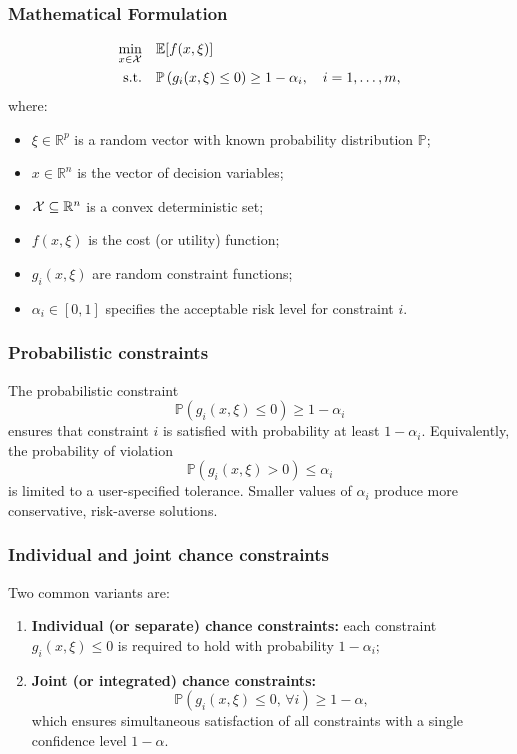 \documentclass{beamer}
\begin{document}
\begin{frame}
\frametitle{Mathematical Formulation}

$$
\begin{aligned}
	\min_{x \in {\mathcal{X}}} \quad & \mathbb{E}[f(x, \xi)] \\
	\text{s.t.} \quad & \mathbb{P}\left( g_i(x, \xi) \leq 0 \right) \geq 1 - \alpha_i, \quad i = 1, \ldots, m,
\end{aligned}
$$
where:
\begin{itemize}
\item \( \xi \in \mathbb{R}^p \) is a random vector with known probability distribution \( \mathbb{P} \);
	\item \( x \in \mathbb{R}^n \) is the vector of decision variables;
	\item \( {\mathcal{X}} \subseteq \mathbb{R}^n \) is a convex deterministic set;
	\item \( f(x, \xi) \) is the cost (or utility) function;
	\item \( g_i(x, \xi) \) are random constraint functions;
	\item \( \alpha_i \in [0, 1] \) specifies the acceptable risk level for constraint \( i \).
\end{itemize}

\end{frame}

\begin{frame}
\frametitle{Probabilistic constraints}

The probabilistic constraint 
\[
\mathbb{P}\left( g_i(x, \xi) \leq 0 \right) \geq 1 - \alpha_i
\]
ensures that constraint \( i \) is satisfied with probability at least \( 1 - \alpha_i \). Equivalently, the probability of violation 
\[
\mathbb{P}\left( g_i(x, \xi) > 0 \right) \leq \alpha_i
\]
is limited to a user-specified tolerance. Smaller values of \( \alpha_i \) produce more conservative, risk-averse solutions.

\end{frame}

\begin{frame}
\frametitle{Individual and joint chance constraints}

Two common variants are:
\begin{enumerate}
	\item \textbf{Individual (or separate) chance constraints:} each constraint \( g_i(x, \xi) \leq 0 \) is required to hold with probability \( 1 - \alpha_i \);
	\item \textbf{Joint (or integrated) chance constraints:}
	\[
	\mathbb{P}\left( g_i(x, \xi) \leq 0, \, \forall i \right) \geq 1 - \alpha,
	\]
	which ensures simultaneous satisfaction of all constraints with a single confidence level \( 1 - \alpha \).
\end{enumerate}

\end{frame}
\end{document}
